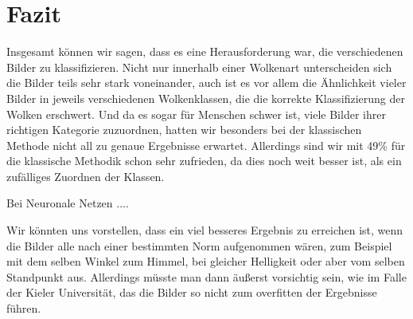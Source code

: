 \documentclass[a4,german]{article}
\begin{document}

\section{Fazit}
\label{sec:fazit}


Insgesamt können wir sagen, dass es eine Herausforderung war, die verschiedenen Bilder zu klassifizieren.
Nicht nur innerhalb einer Wolkenart unterscheiden sich die Bilder teils sehr stark voneinander, auch ist es vor allem die Ähnlichkeit vieler Bilder in jeweils verschiedenen Wolkenklassen, die die korrekte Klassifizierung der Wolken erschwert.
Und da es sogar für Menschen schwer ist, viele Bilder ihrer richtigen Kategorie zuzuordnen, hatten wir besonders bei der klassischen Methode nicht all zu genaue Ergebnisse erwartet.
Allerdings sind wir mit 49\% für die klassische Methodik schon sehr zufrieden, da dies noch weit besser ist, als ein zufälliges Zuordnen der Klassen.

Bei Neuronale Netzen .... %

Wir könnten uns vorstellen, dass ein viel besseres Ergebnis zu erreichen ist, wenn die Bilder alle nach einer bestimmten Norm aufgenommen wären, zum Beispiel mit dem selben Winkel zum Himmel, bei gleicher Helligkeit oder aber vom selben Standpunkt aus.
Allerdings müsste man dann äußerst vorsichtig sein, wie im Falle der Kieler Universität, das die Bilder so nicht zum overfitten der Ergebnisse führen.%



\end{document}
